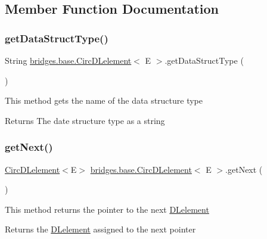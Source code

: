 \subsection{Member Function Documentation}
\mbox{\label{classbridges_1_1base_1_1_circ_d_lelement_ab4885ae7517f1dd04874270c1c3eaf44}} 
\subsubsection{\texorpdfstring{getDataStructType()}{getDataStructType()}}
{\footnotesize\ttfamily String \mbox{\hyperlink{classbridges_1_1base_1_1_circ_d_lelement}{bridges.\+base.\+Circ\+D\+Lelement}}$<$ E $>$.get\+Data\+Struct\+Type (\begin{DoxyParamCaption}{ }\end{DoxyParamCaption})}

This method gets the name of the data structure type

\begin{DoxyReturn}{Returns}
The date structure type as a string 
\end{DoxyReturn}
\mbox{\label{classbridges_1_1base_1_1_circ_d_lelement_a9ace56dde1f4c23e9a8798c045100ee6}} 
\subsubsection{\texorpdfstring{getNext()}{getNext()}}
{\footnotesize\ttfamily \mbox{\hyperlink{classbridges_1_1base_1_1_circ_d_lelement}{Circ\+D\+Lelement}}$<$E$>$ \mbox{\hyperlink{classbridges_1_1base_1_1_circ_d_lelement}{bridges.\+base.\+Circ\+D\+Lelement}}$<$ E $>$.get\+Next (\begin{DoxyParamCaption}{ }\end{DoxyParamCaption})}

This method returns the pointer to the next \mbox{\hyperlink{classbridges_1_1base_1_1_d_lelement}{D\+Lelement}}

\begin{DoxyReturn}{Returns}
the \mbox{\hyperlink{classbridges_1_1base_1_1_d_lelement}{D\+Lelement}} assigned to the next pointer 
\end{DoxyReturn}
\mbox{\label{classbridges_1_1base_1_1_circ_d_lelement_aa2b83017a571694460f77dd31b4188ed}} 
